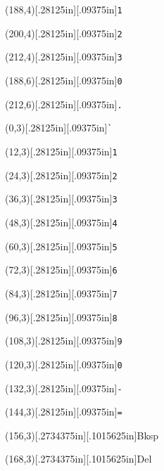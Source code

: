 \documentclass[12pt]{{memoir}}
\newcommand\keycaps[1]{\raisebox{0in}[.2734375in][.1015625in]{\tiny\textsf{#1}}}
\newcommand\keycapt[1]{\raisebox{0in}[.28125in][.09375in]{\texttt{#1}}}
\begin{document}
\begin{center}
\begin{textblock}{12}(188,4)\keycapt{1}\end{textblock}
\begin{textblock}{12}(200,4)\keycapt{2}\end{textblock}
\begin{textblock}{12}(212,4)\keycapt{3}\end{textblock}
\begin{textblock}{24}(188,6)\keycapt{0}\end{textblock}
\begin{textblock}{12}(212,6)\keycapt{.}\end{textblock}
\begin{textblock}{12}(0,3)\keycapt{\`{}}\end{textblock}
\begin{textblock}{12}(12,3)\keycapt{1}\end{textblock}
\begin{textblock}{12}(24,3)\keycapt{2}\end{textblock}
\begin{textblock}{12}(36,3)\keycapt{3}\end{textblock}
\begin{textblock}{12}(48,3)\keycapt{4}\end{textblock}
\begin{textblock}{12}(60,3)\keycapt{5}\end{textblock}
\begin{textblock}{12}(72,3)\keycapt{6}\end{textblock}
\begin{textblock}{12}(84,3)\keycapt{7}\end{textblock}
\begin{textblock}{12}(96,3)\keycapt{8}\end{textblock}
\begin{textblock}{12}(108,3)\keycapt{9}\end{textblock}
\begin{textblock}{12}(120,3)\keycapt{0}\end{textblock}
\begin{textblock}{12}(132,3)\keycapt{-}\end{textblock}
\begin{textblock}{12}(144,3)\keycapt{=}\end{textblock}
\begin{textblock}{12}(156,3)\keycaps{Bksp}\end{textblock}
\begin{textblock}{12}(168,3)\keycaps{Del}\end{textblock}

\end{center}
\end{document}
